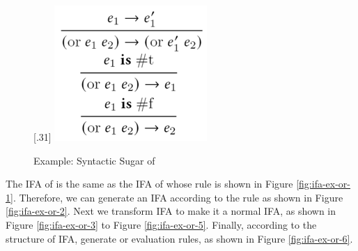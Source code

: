 \begin{figure}[t]
{    }
    [.31\linewidth]{
        \includegraphics[scale=0.3]{images/ifa/ifa-ex-or-6.png}
    }
    \caption{Example: Syntactic Sugar of }
    \label{fig:ifa-nand-std}
\end{figure}

The IFA of  is the same as the IFA of  whose rule is shown in Figure \ref{fig:ifa-ex-or-1}. Therefore, we can generate an IFA according to the rule as shown in Figure \ref{fig:ifa-ex-or-2}. Next we transform IFA to make it a normal IFA, as shown in Figure \ref{fig:ifa-ex-or-3} to Figure \ref{fig:ifa-ex-or-5}. Finally, according to the structure of IFA, generate or evaluation rules, as shown in Figure \ref{fig:ifa-ex-or-6}.




